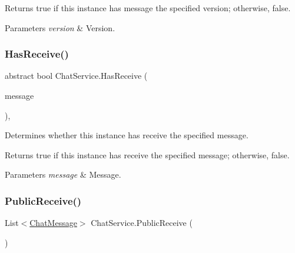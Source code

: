 \begin{DoxyReturn}{Returns}
{\ttfamily true} if this instance has message the specified version; otherwise, {\ttfamily false}.
\end{DoxyReturn}

\begin{DoxyParams}{Parameters}
{\em version} & Version.\\
\hline
\end{DoxyParams}
\mbox{\label{class_chat_service_ac3b151ae5fe90fe7b8e78a8ea1a11a27}} 
\subsubsection{\texorpdfstring{Has\+Receive()}{HasReceive()}}
{\footnotesize\ttfamily abstract bool Chat\+Service.\+Has\+Receive (\begin{DoxyParamCaption}\item[{\mbox{\hyperlink{class_t_net_1_1_model_1_1_chat_message}{Chat\+Message}}}]{message }\end{DoxyParamCaption})\hspace{0.3cm}{\ttfamily [protected]}, {}}



Determines whether this instance has receive the specified message. 

\begin{DoxyReturn}{Returns}
{\ttfamily true} if this instance has receive the specified message; otherwise, {\ttfamily false}.
\end{DoxyReturn}

\begin{DoxyParams}{Parameters}
{\em message} & Message.\\
\hline
\end{DoxyParams}
\mbox{\label{class_chat_service_a3eea8046d720ae3e84ce5c8f4dacf2c1}} 
\subsubsection{\texorpdfstring{Public\+Receive()}{PublicReceive()}}
{\footnotesize\ttfamily List$<$\mbox{\hyperlink{class_t_net_1_1_model_1_1_chat_message}{Chat\+Message}}$>$ Chat\+Service.\+Public\+Receive (\begin{DoxyParamCaption}{ }\end{DoxyParamCaption})}



